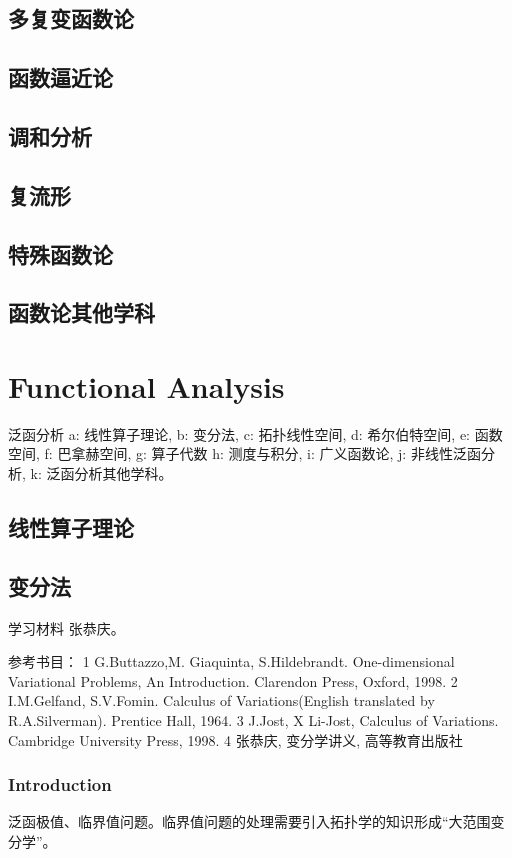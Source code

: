 \documentclass[UTF8]{../09-Mathematics}
\begin{document}
\section{多复变函数论}
\section{函数逼近论}
\section{调和分析}
\section{复流形}
\section{特殊函数论}
\section{函数论其他学科}




\chapter{Functional Analysis}

泛函分析
a: 线性算子理论, 
b: 变分法, 
c: 拓扑线性空间, 
d: 希尔伯特空间, 
e: 函数空间, 
f: 巴拿赫空间, 
g: 算子代数 
h: 测度与积分, 
i: 广义函数论, 
j: 非线性泛函分析, 
k: 泛函分析其他学科。


\section{线性算子理论}

\section{变分法}
学习材料 张恭庆。

参考书目：
1 G.Buttazzo,M. Giaquinta, S.Hildebrandt. One-dimensional Variational Problems, An Introduction. Clarendon Press, Oxford, 1998.
2 I.M.Gelfand, S.V.Fomin. Calculus of Variations(English translated by R.A.Silverman). Prentice Hall, 1964.
3 J.Jost, X Li-Jost, Calculus of Variations. Cambridge University Press, 1998.
4 张恭庆, 变分学讲义, 高等教育出版社

\subsection{Introduction}
泛函极值、临界值问题。临界值问题的处理需要引入拓扑学的知识形成“大范围变分学”。
\end{document}
